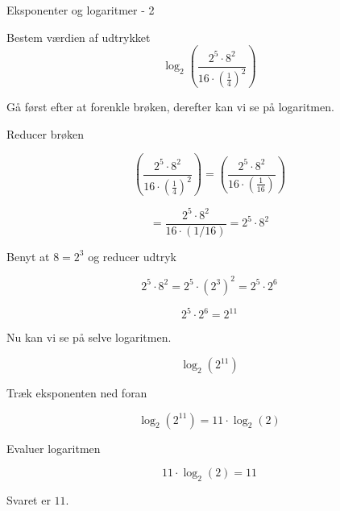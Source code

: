 \documentclass{article}
\begin{document}
\begin{exercise}{Eksponenter og logaritmer - 2}

Bestem værdien af udtrykket
\[
\log_2\left( \frac{2^5 \cdot 8^2}{16 \cdot \left(\frac{1}{4}\right)^2} \right)
\]


\hint
Gå først efter at forenkle brøken, derefter kan vi se på logaritmen.

\hint
Reducer brøken

\hint
\[
\left( \frac{2^5 \cdot 8^2}{16 \cdot \left(\frac{1}{4}\right)^2} \right) = \left( \frac{2^5 \cdot 8^2}{16 \cdot \left(\frac{1}{16}\right)} \right)
\]

\hint
\[
= \frac{2^5 \cdot 8^2}{16 \cdot (1/16)} = 2^5 \cdot 8^2
\]

\hint
Benyt at $8=2^3$ og reducer udtryk

\hint
\[
2^5 \cdot 8^2 = 2^5 \cdot (2^3)^2 = 2^5 \cdot 2^6
 \]

\hint
\[
2^5 \cdot 2^6 = 2^{11}
\]


\hint
Nu kan vi se på selve logaritmen.

\hint
\[
\log_2\left(2^{11}\right)
\]


\hint
Træk eksponenten ned foran

\hint
\[
\log_2\left(2^{11}\right) = 11 \cdot \log_2(2)
\]

\hint
Evaluer logaritmen

\hint
\[
11 \cdot \log_2(2) = 11
\]

\hint
Svaret er $11$.

\end{exercise}

\newpage
\end{document}
